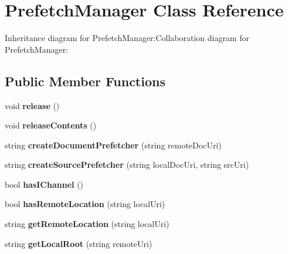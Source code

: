 \section{PrefetchManager Class Reference}
\label{classbr_1_1pucrio_1_1telemidia_1_1ginga_1_1ncl_1_1prefetch_1_1PrefetchManager}
Inheritance diagram for PrefetchManager:Collaboration diagram for PrefetchManager:\subsection*{Public Member Functions}
\begin{CompactItemize}
\item 
void \textbf{release} ()\label{classbr_1_1pucrio_1_1telemidia_1_1ginga_1_1ncl_1_1prefetch_1_1PrefetchManager_23b477d0e2d399f75d585d154c346591}

\item 
void \textbf{releaseContents} ()\label{classbr_1_1pucrio_1_1telemidia_1_1ginga_1_1ncl_1_1prefetch_1_1PrefetchManager_57fd02f79913ae866bd4fe3e7298d2cb}

\item 
string \textbf{createDocumentPrefetcher} (string remoteDocUri)\label{classbr_1_1pucrio_1_1telemidia_1_1ginga_1_1ncl_1_1prefetch_1_1PrefetchManager_e0d3648c57a84fe11efc44c2dce98f17}

\item 
string \textbf{createSourcePrefetcher} (string localDocUri, string srcUri)\label{classbr_1_1pucrio_1_1telemidia_1_1ginga_1_1ncl_1_1prefetch_1_1PrefetchManager_69392c1b1778beabfde72a17300a1fb2}

\item 
bool \textbf{hasIChannel} ()\label{classbr_1_1pucrio_1_1telemidia_1_1ginga_1_1ncl_1_1prefetch_1_1PrefetchManager_d6b5ba3e548a3f14c03593f7e45c52ed}

\item 
bool \textbf{hasRemoteLocation} (string localUri)\label{classbr_1_1pucrio_1_1telemidia_1_1ginga_1_1ncl_1_1prefetch_1_1PrefetchManager_7912244e19271bd578454632d910b9da}

\item 
string \textbf{getRemoteLocation} (string localUri)\label{classbr_1_1pucrio_1_1telemidia_1_1ginga_1_1ncl_1_1prefetch_1_1PrefetchManager_663203b2fef27841f3a8e984ef81a091}

\item 
string \textbf{getLocalRoot} (string remoteUri)\label{classbr_1_1pucrio_1_1telemidia_1_1ginga_1_1ncl_1_1prefetch_1_1PrefetchManager_c5187a62a514f26103b9abe2ec9e27aa}


\end{CompactItemize}
